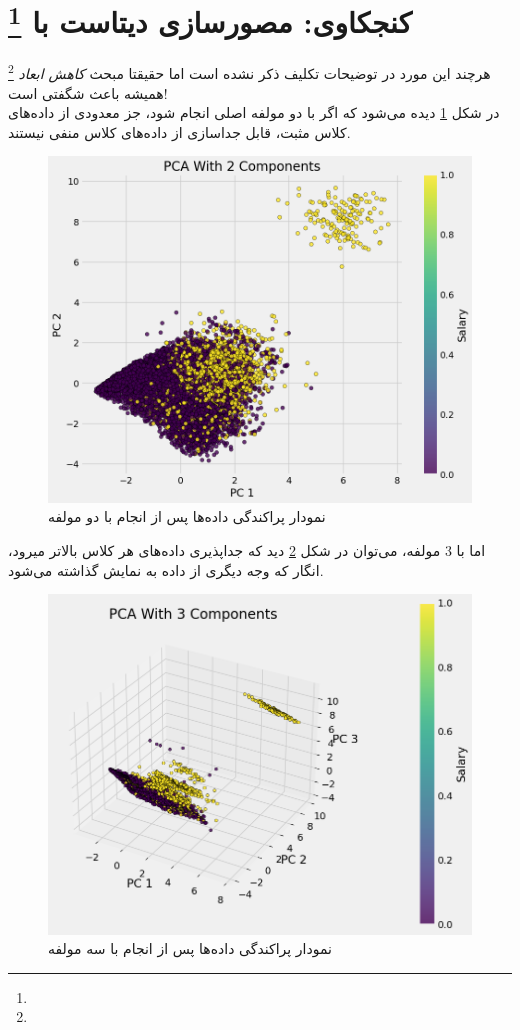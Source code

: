 \documentclass{article}
\begin{document}
	\section{
    کنجکاوی: مصورسازی دیتاست با
		\footnote{}
	}
	هرچند این مورد در توضیحات تکلیف ذکر نشده است اما حقیقتا مبحث \textit{کاهش ابعاد}
	\footnote{}
	همیشه باعث شگفتی است!\\
	 در شکل 
	 \ref{fig: pca 2}
	 دیده می‌شود که اگر 
	 با دو مولفه اصلی انجام شود، جز معدودی از داده‌های کلاس مثبت، قابل جداسازی از داده‌های کلاس منفی نیستند.\\
	\begin{figure}[H]
		\centering
		\includegraphics[scale=0.5]{figs/pca2}
		\caption{
			نمودار پراکندگی داده‌ها پس از انجام
			با دو مولفه
		}
		\label{fig: pca 2}
	\end{figure} 
	اما با 3 مولفه، می‌توان در شکل
	\ref{fig: pca 3}
	 دید که جداپذیری داده‌های هر کلاس بالاتر میرود، انگار که وجه دیگری از داده به نمایش گذاشته می‌شود.
	\begin{figure}[H]
		\centering
		\includegraphics[scale=0.5]{figs/pca3}
		\caption{
			نمودار پراکندگی داده‌ها پس از انجام
			با سه مولفه
		}
		\label{fig: pca 3}
	\end{figure} 
\end{document}
